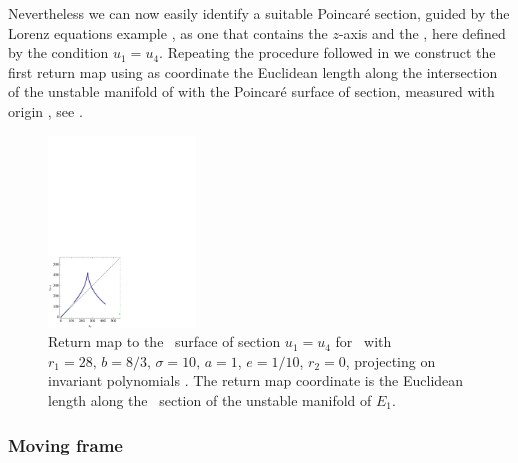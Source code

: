 Nevertheless we can now easily identify a suitable Poincar\'e section, guided
by the Lorenz equations example , as one that contains the $z$-axis and the \reqv,
here defined by the condition $u_1=u_4$. Repeating the procedure followed in 
we construct the first return map using as coordinate the Euclidean length along the intersection
of the unstable manifold of  with the Poincar\'e surface of section, measured with origin , see .


\begin{figure}[ht]
\begin{center}
\includegraphics[width=0.35\textwidth]{../figs/CLEipRM}
\end{center}
\caption[Return map for Complex Lorenz flow, invariant polynomials]{Return map to the \Poincare\
surface of section $u_1=u_4$ for \CLe\ with $r_1=28,\, b=8/3,\, \sigma=10,\, a=1$, $e=1/10$, $r_2=0$,
projecting on invariant polynomials \refeq{eq:ipLaser}.
The return map coordinate is the Euclidean
length along the \Poincare\ section of the unstable manifold of $E_1$.
    }
\label{fig:CLEipRM}
\end{figure}

\subsubsection{Moving frame}
\label{sec:CLeMF}



